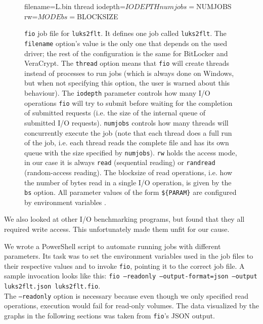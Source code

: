 \begin{figure}[htb!]
	\begin{inicode}
filename=L\:\random.bin
thread
iodepth=${IODEPTH}
numjobs=${NUMJOBS}
rw=${MODE}
bs=${BLOCKSIZE}
	\end{inicode}
	\caption[
		\texttt{fio} job file for \texttt{luks2flt}
	]{
		\texttt{fio} job file for \texttt{luks2flt}. It defines one job called \texttt{luks2flt}. The \texttt{filename} option's value is the only one that depends on the used driver; the rest of the configuration is the same for BitLocker and VeraCrypt. The \texttt{thread} option means that \texttt{fio} will create threads instead of processes to run jobs (which is always done on Windows, but when not specifying this option, the user is warned about this behaviour). The \texttt{iodepth} parameter controls how many I/O operations \texttt{fio} will try to submit before waiting for the completion of submitted requests (i.e. the size of the internal queue of submitted I/O requests). \texttt{numjobs} controls how many threads will concurrently execute the job (note that each thread does a full run of the job, i.e. each thread reads the complete file and has its own queue with the size specified by \texttt{numjobs}). \texttt{rw} holds the access mode, in our case it is always \texttt{read} (sequential reading) or \texttt{randread} (random-access reading). The blocksize of read operations, i.e. how the number of bytes read in a single I/O operation, is given by the \texttt{bs} option. All parameter values of the form \texttt{\$\{PARAM\}} are configured by environment variables \cite{Fio}.
	}
	\label{fig:performance.setup.fiojobfile}
\end{figure}

We also looked at other I/O benchmarking programs, but found that they all required write access. This unfortunately made them unfit for our cause.

We wrote a PowerShell script to automate running jobs with different parameters. Its task was to set the environment variables used in the job files to their respective values and to invoke \texttt{fio}, pointing it to the correct job file. A sample invocation looks like this: \texttt{fio ---readonly ---output-format=json ---output luks2flt.json luks2flt.fio}.\\The \texttt{---readonly} option is necessary because even though we only specified read operations, execution would fail for read-only volumes. The data visualized by the graphs in the following sections was taken from \texttt{fio}'s JSON output.

